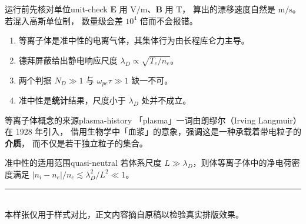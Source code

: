 \documentclass[11pt,a4paper,openany,oneside]{book}
\newcommand{\vect}[1]{\bm{#1}}
\begin{document}
\begin{tip}{运行前先核对单位}{unit-check}
$\vect{E}$ 用 $\mathrm{V/m}$、$\vect{B}$ 用 $\mathrm{T}$，
算出的漂移速度自然是 $\mathrm{m/s}$。若混入高斯单位制，
数量级会差 $10^4$ 倍而不会报错。
\end{tip}

\clearpage

\begin{chapterreview}
\begin{enumerate}
  \item 等离子体是准中性的电离气体，其集体行为由长程库仑力主导。
  \item 德拜屏蔽给出静电响应尺度 $\lambda_D\propto\sqrt{T_e/n_e}$。
  \item 两个判据 $N_D\gg1$ 与 $\omega_{pe}\tau\gg1$ 缺一不可。
  \item 准中性是\textbf{统计}结果，尺度小于 $\lambda_D$ 处并不成立。
\end{enumerate}
\end{chapterreview}

\begin{history}{等离子体概念的来源}{plasma-history}
「plasma」一词由朗缪尔（Irving Langmuir）在 1928 年引入，
借用生物学中「血浆」的意象，强调这是一种承载着带电粒子的\textbf{介质}，
而不仅是若干独立粒子的集合。
\end{history}

\begin{corollary}{准中性的适用范围}{quasi-neutral}
若体系尺度 $L\gg\lambda_D$，则体等离子体中的净电荷密度满足
$|n_i-n_e|/n_e\lesssim\lambda_D^2/L^2\ll1$。
\end{corollary}

\vfill
\noindent\rule{\textwidth}{0.4pt}\\[0.4em]
{\small\color{inkMuted}本样张仅用于样式对比，正文内容摘自原稿以检验真实排版效果。}
\end{document}
